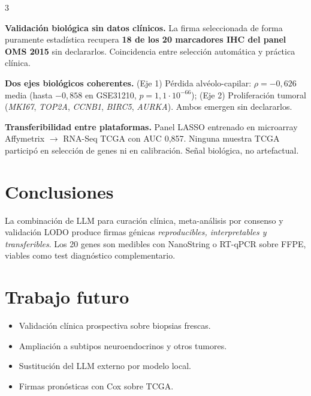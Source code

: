 \documentclass[10pt, a4paper, landscape]{article}
\newcommand{\gene}[1]{\textit{#1}}
\begin{document}
\begin{multicols}{3}
\begin{hallazgo}
\textbf{\color{uaxdark}Validaci\'on biol\'ogica sin datos cl\'inicos.}
La firma seleccionada de forma puramente estad\'istica recupera
\textbf{18 de los 20 marcadores IHC del panel OMS 2015} sin declararlos.
Coincidencia entre selecci\'on autom\'atica y pr\'actica cl\'inica.
\end{hallazgo}

\begin{hallazgo}
\textbf{\color{uaxdark}Dos ejes biol\'ogicos coherentes.}
(Eje 1) P\'erdida alv\'eolo-capilar: $\rho=-0{,}626$ media (hasta
$-0{,}858$ en GSE31210, $p=1{,}1\!\cdot\!10^{-66}$); (Eje 2)
Proliferaci\'on tumoral (\gene{MKI67}, \gene{TOP2A}, \gene{CCNB1},
\gene{BIRC5}, \gene{AURKA}). Ambos emergen sin declararlos.
\end{hallazgo}

\begin{hallazgo}
\textbf{\color{uaxdark}Transferibilidad entre plataformas.}
Panel LASSO entrenado en microarray Affymetrix $\to$ RNA-Seq TCGA con
AUC 0,857. Ninguna muestra TCGA particip\'o en selecci\'on de genes ni
en calibraci\'on. Se\~nal biol\'ogica, no artefactual.
\end{hallazgo}

\section{Conclusiones}
\footnotesize
La combinaci\'on de LLM para curaci\'on cl\'inica, meta-an\'alisis por
consenso y validaci\'on LODO produce firmas g\'enicas
\textcolor{uaxdark}{\emph{reproducibles, interpretables y
transferibles}}. Los 20 genes son medibles con NanoString o RT-qPCR
sobre FFPE, viables como test diagn\'ostico complementario.

\section{Trabajo futuro}
\footnotesize
\begin{itemize}[leftmargin=1em, itemsep=1pt, topsep=1pt]
  \item Validaci\'on cl\'inica prospectiva sobre biopsias frescas.
  \item Ampliaci\'on a subtipos neuroendocrinos y otros tumores.
  \item Sustituci\'on del LLM externo por modelo local.
  \item Firmas pron\'osticas con Cox sobre TCGA.
\end{itemize}

\end{multicols}
\end{document}
